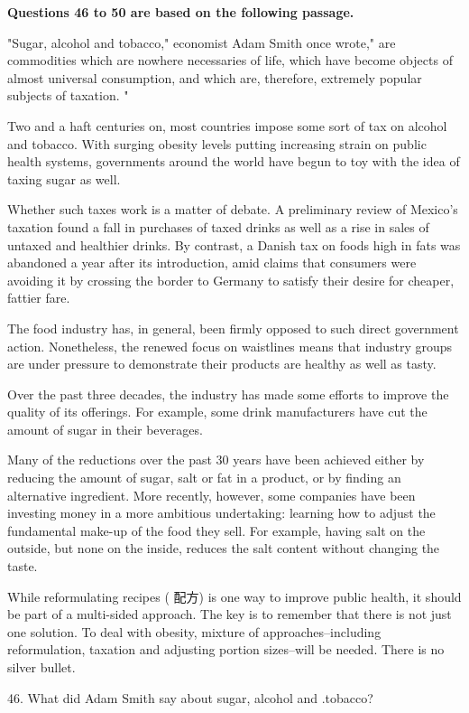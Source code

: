 \documentclass[UTF8,11pt]{ctexart}
\begin{document}
\textbf{Questions 46 to 50 are based on the following passage.}


"Sugar, alcohol and tobacco," economist Adam Smith once wrote," are commodities which are nowhere necessaries of life, which have become objects of almost universal consumption, and which are, therefore, extremely popular subjects of taxation. "


Two and a haft centuries on, most countries impose some sort of tax on alcohol and tobacco. With surging obesity levels putting increasing strain on public health systems, governments around the world have begun to toy with the idea of taxing sugar as well.


Whether such taxes work is a matter of debate. A preliminary review of Mexico's taxation found a fall in purchases of taxed drinks as well as a rise in sales of untaxed and healthier drinks. By contrast, a Danish tax on foods high in fats was abandoned a year after its introduction, amid claims that consumers were avoiding it by crossing the border to Germany to satisfy their desire for cheaper, fattier fare.


The food industry has, in general, been firmly opposed to such direct government action. Nonetheless, the renewed focus on waistlines means that industry groups are under pressure to demonstrate their products are healthy as well as tasty.


Over the past three decades, the industry has made some efforts to improve the quality of its offerings. For example, some drink manufacturers have cut the amount of sugar in their beverages.


Many of the reductions over the past 30 years have been achieved either by reducing the amount of sugar, salt or fat in a product, or by finding an alternative ingredient. More recently, however, some companies have been investing money in a more ambitious undertaking: learning how to adjust the fundamental make-up of the food they sell. For example, having salt on the outside, but none on the inside, reduces the salt content without changing the taste.


While reformulating recipes ( 配方) is one way to improve public health, it should be part of a multi-sided approach. The key is to remember that there is not just one solution. To deal with obesity, mixture of approaches--including reformulation, taxation and adjusting portion sizes--will be needed. There is no silver bullet.


46. What did Adam Smith say about sugar, alcohol and .tobacco?
\end{document}

